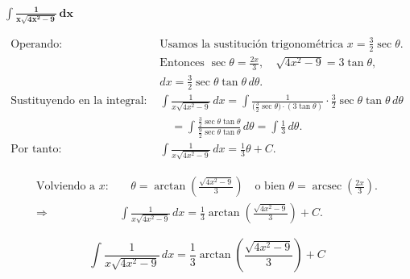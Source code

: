 $\displaystyle \mathbf{\int \frac{1}{x\sqrt{4x^{2}-9}}\,dx}$

\nopagebreak
$$
\begin{aligned}
\text{Operando: } &
\text{Usamos la sustitución trigonométrica } x=\tfrac{3}{2}\sec\theta. \\[6pt]
&\text{Entonces } \sec\theta=\tfrac{2x}{3},\quad 
\sqrt{4x^{2}-9}=3\tan\theta, \\[4pt]
&dx=\tfrac{3}{2}\sec\theta\tan\theta\,d\theta. \\[8pt]
\text{Sustituyendo en la integral: } &
\int \frac{1}{x\sqrt{4x^{2}-9}}\,dx
= \int \frac{1}{\big(\tfrac{3}{2}\sec\theta\big)\cdot(3\tan\theta)}
\cdot \tfrac{3}{2}\sec\theta\tan\theta\,d\theta \\[6pt]
&\quad= \int \frac{\tfrac{3}{2}\sec\theta\tan\theta}{\tfrac{9}{2}\sec\theta\tan\theta}\,d\theta
= \int \tfrac{1}{3}\,d\theta. \\[8pt]
\text{Por tanto: } &
\int \frac{1}{x\sqrt{4x^{2}-9}}\,dx = \tfrac{1}{3}\theta + C.
\end{aligned}
$$

\nopagebreak
$$
\begin{aligned}
\text{Volviendo a } x: &\quad \theta=\arctan\!\!\left(\frac{\sqrt{4x^{2}-9}}{3}\right)
\quad\text{o bien }\theta=\operatorname{arcsec}\!\!\left(\frac{2x}{3}\right). \\[6pt]
\Rightarrow\quad &
\int \frac{1}{x\sqrt{4x^{2}-9}}\,dx
= \frac{1}{3}\arctan\!\!\left(\frac{\sqrt{4x^{2}-9}}{3}\right) + C.
\end{aligned}
$$

$$
\boxed{\displaystyle 
\int \frac{1}{x\sqrt{4x^{2}-9}}\,dx
= \frac{1}{3}\arctan\!\!\left(\frac{\sqrt{4x^{2}-9}}{3}\right) + C}
$$
